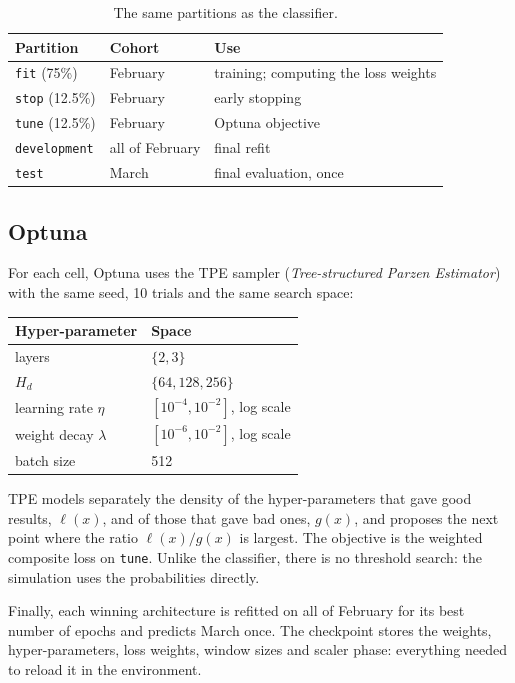\documentclass[11pt]{article}
\newcommand{\code}[1]{\texttt{#1}}
\begin{document}
\begin{table}[H]
\centering
\begin{tabular}{lll}
\toprule
\textbf{Partition} & \textbf{Cohort} & \textbf{Use} \\
\midrule
\code{fit} (75\%) & February & training; computing the loss weights \\
\code{stop} (12.5\%) & February & early stopping \\
\code{tune} (12.5\%) & February & Optuna objective \\
\code{development} & all of February & final refit \\
\code{test} & March & final evaluation, once \\
\bottomrule
\end{tabular}
\caption{The same partitions as the classifier.}
\end{table}

\subsection{Optuna}

For each cell, Optuna uses the TPE sampler (\emph{Tree-structured Parzen Estimator}) with the same seed, 10 trials and the same search space:
\begin{center}
\begin{tabular}{ll}
\toprule
\textbf{Hyper-parameter} & \textbf{Space} \\
\midrule
layers & $\{2, 3\}$ \\
$H_d$ & $\{64, 128, 256\}$ \\
learning rate $\eta$ & $[10^{-4}, 10^{-2}]$, log scale \\
weight decay $\lambda$ & $[10^{-6}, 10^{-2}]$, log scale \\
batch size & 512 \\
\bottomrule
\end{tabular}
\end{center}
TPE models separately the density of the hyper-parameters that gave good results, $\ell(x)$, and of those that gave bad ones, $g(x)$, and proposes the next point where the ratio $\ell(x)/g(x)$ is largest. The objective is the weighted composite loss on \code{tune}. Unlike the classifier, there is no threshold search: the simulation uses the probabilities directly.

Finally, each winning architecture is refitted on all of February for its best number of epochs and predicts March once. The checkpoint stores the weights, hyper-parameters, loss weights, window sizes and scaler phase: everything needed to reload it in the environment.
\end{document}
